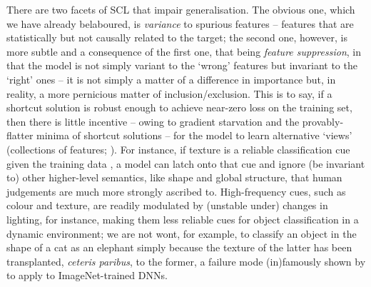 There are two facets of \ac{SCL} that impair generalisation.
%
The obvious one, which we have already belaboured, is \emph{variance} to spurious features --
features that are statistically but not causally related to the target; the second one, however, is
more subtle and a consequence of the first one, that being \emph{feature suppression}, in that the
model is not simply variant to the `wrong' features but invariant to the `right' ones -- it is not
simply a matter of a difference in importance but, in reality, a more pernicious matter of
inclusion/exclusion.
%
%
This is to say, if a shortcut solution is robust enough to achieve near-zero loss on the training
set, then there is little incentive -- owing to gradient starvation \citep{pezeshki2021gradient}
and the provably-flatter minima of shortcut solutions \citep{scimeca2021shortcut} -- for the model
to learn alternative `views' (collections of features; \citealp{allen2020towards}).
%
For instance, if texture is a reliable classification cue given the training data
\citep{geirhos2018imagenet}, a model can latch onto that cue and ignore (be invariant to) other
higher-level semantics, like shape and global structure, that human judgements are much more
strongly ascribed to.
%
High-frequency cues, such as colour and texture, are readily modulated by (unstable under) changes
in lighting, for instance, making them less reliable cues for object classification in a dynamic
environment; we are not wont, for example, to classify an object in the shape of a cat as an
elephant simply because the texture of the latter has been transplanted, \emph{ceteris paribus}, to
the former, a failure mode (in)famously shown by \citet{geirhos2018imagenet} to apply to
ImageNet-trained \acp{DNN}.

